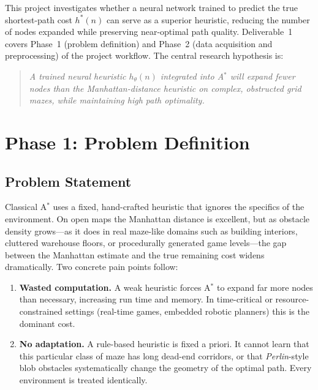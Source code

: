 \documentclass[11pt]{article}
\begin{document}
This project investigates whether a neural network trained to predict the true
shortest-path cost $h^\ast(n)$ can serve as a superior heuristic, reducing the number of
nodes expanded while preserving near-optimal path quality. Deliverable~1 covers
Phase~1 (problem definition) and Phase~2 (data acquisition and preprocessing) of the
project workflow. The central research hypothesis is:

\begin{quote}
\itshape
A trained neural heuristic $h_\theta(n)$ integrated into A$^\ast$ will expand fewer
nodes than the Manhattan-distance heuristic on complex, obstructed grid mazes, while
maintaining high path optimality.
\end{quote}

\section{Phase 1: Problem Definition}

\subsection{Problem Statement}
Classical A$^\ast$ uses a fixed, hand-crafted heuristic that ignores the specifics of the
environment. On open maps the Manhattan distance is excellent, but as obstacle density
grows---as it does in real maze-like domains such as building interiors, cluttered
warehouse floors, or procedurally generated game levels---the gap between the Manhattan
estimate and the true remaining cost widens dramatically. Two concrete pain points
follow:

\begin{enumerate}
  \item \textbf{Wasted computation.} A weak heuristic forces A$^\ast$ to expand far more
  nodes than necessary, increasing run time and memory. In time-critical or
  resource-constrained settings (real-time games, embedded robotic planners) this is the
  dominant cost.
  \item \textbf{No adaptation.} A rule-based heuristic is fixed a priori. It cannot learn
  that this particular class of maze has long dead-end corridors, or that
  \emph{Perlin}-style blob obstacles systematically change the geometry of the optimal
  path. Every environment is treated identically.
\end{enumerate}
\end{document}
